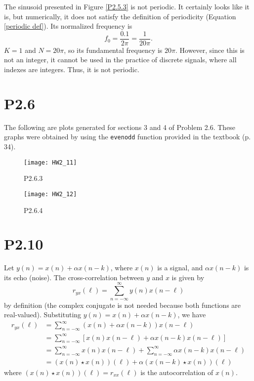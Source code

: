 \documentclass{article}
\renewcommand{\c}[1]{\texttt{#1}}
\begin{document}
The sinusoid presented in Figure \ref{P2.5.3} is not periodic.
It certainly looks like it is, but numerically, it does not
satisfy the definition of periodicity
(Equation \eqref{periodic def}). Its normalized frequency is
\begin{equation*}
    f_0 = \frac{0.1}{2\pi} = \frac{1}{20\pi}.
\end{equation*} \(K = 1\) and \(N = 20\pi\), so its fundamental
frequency is \(20\pi\). However, since this is not an integer,
it cannot be used in the practice of discrete signals, where
all indexes are integers. Thus, it is not periodic.

\section*{P2.6}

The following are plots generated for sections 3 and 4 of
Problem 2.6. These graphs were obtained by using the \c{evenodd}
function provided in the textbook (p. 34).

\begin{figure}[H]
    \centering
    \texttt{[image: HW2\_11]}
    \caption{P2.6.3}
    \label{P2.6.3}
\end{figure}%
\begin{figure}[H]
    \centering
    \texttt{[image: HW2\_12]}
    \caption{P2.6.4}
    \label{P2.6.4}
\end{figure}%

\section*{P2.10}

Let \(y(n) = x(n) + \alpha x(n - k)\), where \(x(n)\) is a
signal, and \(\alpha x(n - k)\) is its echo (noise). The
cross-correlation between \(y\) and \(x\) is given by
\begin{equation*}
    r_{yx}(\ell) = \sum_{n = -\infty}^\infty y(n)x(n-\ell)
\end{equation*}
by definition (the complex conjugate is not needed because both
functions are real-valued).
Substituting \(y(n) = x(n) + \alpha x(n - k)\), we have
\begin{align*}
    r_{yx}(\ell) &= \sum_{n = -\infty}^\infty
    (x(n) + \alpha x(n - k))x(n-\ell)\\
    &= \sum_{n = -\infty}^\infty
    \left[ x(n)x(n-\ell) + \alpha x(n - k)x(n-\ell) \right]\\
    &= \sum_{n = -\infty}^\infty x(n)x(n-\ell) +
    \sum_{n = -\infty}^\infty \alpha x(n - k)x(n-\ell)\\
    &= (x(n)\star x(n))(\ell) + \alpha(x(n-k)\star x(n))(\ell)
\end{align*} where \((x(n)\star x(n))(\ell) = r_{xx}(\ell) \)
is the autocorrelation of \(x(n)\).
\end{document}
